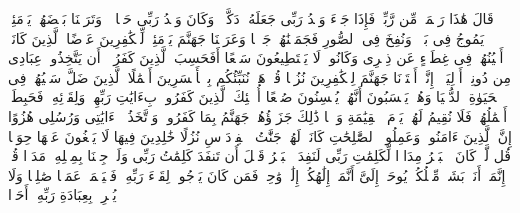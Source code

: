 قَالَ هَٰذَا رَحۡمَةࣱ مِّن رَّبِّیۖ فَإِذَا جَاۤءَ وَعۡدُ رَبِّی جَعَلَهُۥ دَكَّاۤءَۖ وَكَانَ وَعۡدُ رَبِّی حَقࣰّا%
\stopbuffer
\startbuffer[\q:18:99]
۞ وَتَرَكۡنَا بَعۡضَهُمۡ یَوۡمَئِذࣲ یَمُوجُ فِی بَعۡضࣲۖ وَنُفِخَ فِی ٱلصُّورِ فَجَمَعۡنَٰهُمۡ جَمۡعࣰا%
\stopbuffer
\startbuffer[\q:18:100]
وَعَرَضۡنَا جَهَنَّمَ یَوۡمَئِذࣲ لِّلۡكَٰفِرِینَ عَرۡضًا%
\stopbuffer
\startbuffer[\q:18:101]
ٱلَّذِینَ كَانَتۡ أَعۡیُنُهُمۡ فِی غِطَاۤءٍ عَن ذِكۡرِی وَكَانُوا۟ لَا یَسۡتَطِیعُونَ سَمۡعًا%
\stopbuffer
\startbuffer[\q:18:102]
أَفَحَسِبَ ٱلَّذِینَ كَفَرُوۤا۟ أَن یَتَّخِذُوا۟ عِبَادِی مِن دُونِیۤ أَوۡلِیَاۤءَۚ إِنَّاۤ أَعۡتَدۡنَا جَهَنَّمَ لِلۡكَٰفِرِینَ نُزُلࣰا%
\stopbuffer
\startbuffer[\q:18:103]
قُلۡ هَلۡ نُنَبِّئُكُم بِٱلۡأَخۡسَرِینَ أَعۡمَٰلًا%
\stopbuffer
\startbuffer[\q:18:104]
ٱلَّذِینَ ضَلَّ سَعۡیُهُمۡ فِی ٱلۡحَیَوٰةِ ٱلدُّنۡیَا وَهُمۡ یَحۡسَبُونَ أَنَّهُمۡ یُحۡسِنُونَ صُنۡعًا%
\stopbuffer
\startbuffer[\q:18:105]
أُو۟لَٰۤئِكَ ٱلَّذِینَ كَفَرُوا۟ بِءَایَٰتِ رَبِّهِمۡ وَلِقَاۤئِهِۦ فَحَبِطَتۡ أَعۡمَٰلُهُمۡ فَلَا نُقِیمُ لَهُمۡ یَوۡمَ ٱلۡقِیَٰمَةِ وَزۡنࣰا%
\stopbuffer
\startbuffer[\q:18:106]
ذَٰلِكَ جَزَاۤؤُهُمۡ جَهَنَّمُ بِمَا كَفَرُوا۟ وَٱتَّخَذُوۤا۟ ءَایَٰتِی وَرُسُلِی هُزُوًا%
\stopbuffer
\startbuffer[\q:18:107]
إِنَّ ٱلَّذِینَ ءَامَنُوا۟ وَعَمِلُوا۟ ٱلصَّٰلِحَٰتِ كَانَتۡ لَهُمۡ جَنَّٰتُ ٱلۡفِرۡدَوۡسِ نُزُلًا%
\stopbuffer
\startbuffer[\q:18:108]
خَٰلِدِینَ فِیهَا لَا یَبۡغُونَ عَنۡهَا حِوَلࣰا%
\stopbuffer
\startbuffer[\q:18:109]
قُل لَّوۡ كَانَ ٱلۡبَحۡرُ مِدَادࣰا لِّكَلِمَٰتِ رَبِّی لَنَفِدَ ٱلۡبَحۡرُ قَبۡلَ أَن تَنفَدَ كَلِمَٰتُ رَبِّی وَلَوۡ جِئۡنَا بِمِثۡلِهِۦ مَدَدࣰا%
\stopbuffer
\startbuffer[\q:18:110]
قُلۡ إِنَّمَاۤ أَنَا۠ بَشَرࣱ مِّثۡلُكُمۡ یُوحَىٰۤ إِلَیَّ أَنَّمَاۤ إِلَٰهُكُمۡ إِلَٰهࣱ وَٰحِدࣱۖ فَمَن كَانَ یَرۡجُوا۟ لِقَاۤءَ رَبِّهِۦ فَلۡیَعۡمَلۡ عَمَلࣰا صَٰلِحࣰا وَلَا یُشۡرِكۡ بِعِبَادَةِ رَبِّهِۦۤ أَحَدَۢا%
\stopbuffer
